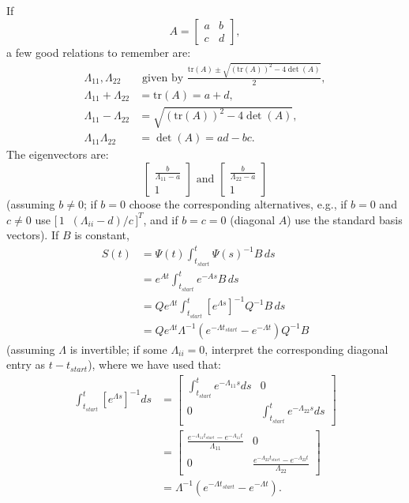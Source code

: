 \documentclass[../../lecture_notes.tex]{subfiles}
\begin{document}
If
\begin{equation*}
  A=\left[
  \begin{array}{cc}
    a & b \\
    c & d
  \end{array}
  \right],
\end{equation*}
a few good relations to remember are:
\begin{align*}
  \Lambda_{11},\Lambda_{22}& \text{ given by } \frac{\mathrm{tr}(A)\pm \sqrt{(\mathrm{tr}(A))^{2}-4\det(A)}}{2}, \\
  \Lambda_{11}+\Lambda_{22} &=\mathrm{tr}(A)=a+d, \\
  \Lambda_{11}-\Lambda_{22} &=\sqrt{(\mathrm{tr}(A))^{2}-4\det(A)}, \\
  \Lambda_{11}\Lambda_{22} &=\det(A)=ad-bc.
\end{align*}
The eigenvectors are:
\begin{equation*}
  \left[
  \begin{array}{c}
    \frac{b}{\Lambda_{11}-a} \\
    1
  \end{array}
  \right] \text{ and }
  \left[
  \begin{array}{c}
    \frac{b}{\Lambda_{22}-a} \\
    1
  \end{array}
  \right]
\end{equation*}
(assuming $b\ne 0$; if $b=0$ choose the corresponding alternatives, e.g., if $b=0$ and $c\ne 0$
use $\bigl[\,1\;\; (\Lambda_{ii}-d)/c\,\bigr]^T$, and if $b=c=0$ (diagonal $A$) use the standard basis vectors).
If $B$ is constant,
\begin{align*}
  S(t) &=\Psi(t)\int_{t_{start}}^{t}\Psi(s)^{-1}B\,ds \\
  &=e^{At}\int_{t_{start}}^{t}e^{-As}B\,ds \\
  &=Qe^{\Lambda t}\int_{t_{start}}^{t}\left[ e^{\Lambda s}\right]^{-1}Q^{-1}B\,ds \\
  &=Qe^{\Lambda t}\Lambda^{-1}\left( e^{-\Lambda t_{start}}-e^{-\Lambda t}\right) Q^{-1}B
\end{align*}
(assuming $\Lambda$ is invertible; if some $\Lambda_{ii}=0$, interpret the corresponding diagonal entry as $t-t_{start}$), where we have used that:
\begin{align*}
  \int_{t_{start}}^{t}\left[ e^{\Lambda s}\right]^{-1}ds &=\left[
  \begin{array}{cc}
    \int_{t_{start}}^{t}e^{-\Lambda_{11}s}ds & 0 \\
    0 & \int_{t_{start}}^{t}e^{-\Lambda_{22}s}ds
  \end{array}
  \right] \\
  &=\left[
  \begin{array}{cc}
    \frac{e^{-\Lambda_{11}t_{start}}-e^{-\Lambda_{11}t}}{\Lambda_{11}} & 0 \\
    0 & \frac{e^{-\Lambda_{22}t_{start}}-e^{-\Lambda_{22}t}}{\Lambda_{22}}
  \end{array}
  \right] \\
  &=\Lambda^{-1}\left( e^{-\Lambda t_{start}}-e^{-\Lambda t}\right).
\end{align*}
\end{document}
